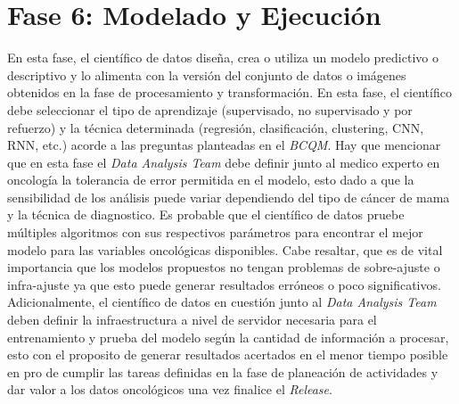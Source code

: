 \section{Fase 6: Modelado y Ejecución}
En esta fase, el científico de datos diseña, crea o utiliza un modelo predictivo o descriptivo y lo alimenta con la versión del conjunto de datos o imágenes obtenidos en la fase de procesamiento y transformación. En esta fase, el científico debe seleccionar el tipo de aprendizaje (supervisado, no supervisado y por refuerzo) y la técnica determinada (regresión, clasificación, clustering, CNN, RNN, etc.) acorde a las preguntas planteadas en el \textit{BCQM}. Hay que mencionar que en esta fase el \textit{Data Analysis Team} debe definir junto al medico experto en oncología la tolerancia de error permitida en el modelo, esto dado a que la sensibilidad de los análisis puede variar dependiendo del tipo de cáncer de mama y la técnica de diagnostico. Es probable que el científico de datos pruebe múltiples algoritmos con sus respectivos parámetros para encontrar el mejor modelo para las variables oncológicas disponibles. Cabe resaltar, que es de vital importancia que los modelos propuestos no tengan problemas de sobre-ajuste o infra-ajuste ya que esto puede generar resultados erróneos o poco significativos. Adicionalmente, el científico de datos en cuestión junto al \textit{Data Analysis Team} deben definir la infraestructura a nivel de servidor necesaria para el entrenamiento y prueba del modelo según la cantidad de información a procesar, esto con el proposito de generar resultados acertados en el menor tiempo posible en pro de cumplir las tareas definidas en la fase de planeación de actividades y dar valor a los datos oncológicos una vez finalice el \textit{Release}.